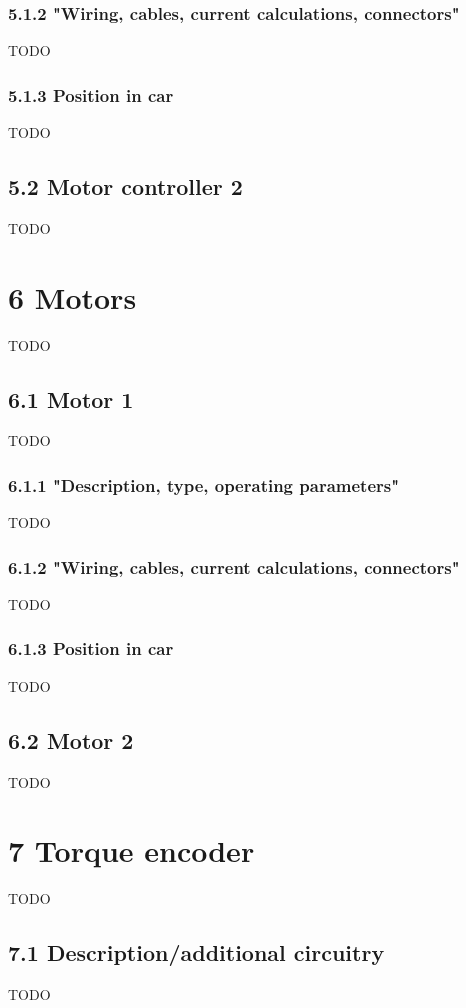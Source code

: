 \documentclass{article}
\begin{document}
\subsubsection*{5.1.2 "Wiring, cables, current calculations, connectors"}
TODO

\subsubsection*{5.1.3 Position in car}
TODO

\subsection*{5.2 Motor controller 2}
TODO

\section*{6 Motors}
TODO

\subsection*{6.1 Motor 1}
TODO

\subsubsection*{6.1.1 "Description, type, operating parameters"}
TODO

\subsubsection*{6.1.2 "Wiring, cables, current calculations, connectors"}
TODO

\subsubsection*{6.1.3 Position in car}
TODO

\subsection*{6.2 Motor 2}
TODO

\section*{7 Torque encoder}
TODO

\subsection*{7.1 Description/additional circuitry}
TODO
\end{document}
